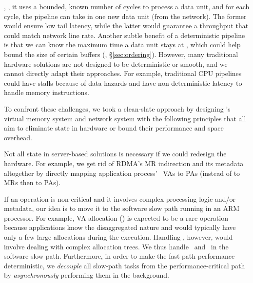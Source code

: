 ,
\ie, it uses a bounded, known number of cycles to process a data unit, and for each cycle, the pipeline can take in one new data unit (from the network).
The former would ensure low tail latency, while the latter would guarantee a throughput that could match network line rate.
Another subtle benefit of a deterministic pipeline is that we can know the maximum time a data unit stays at \MN,
which could help bound the size of certain buffers (\eg, \S\ref{sec:ordering}).
However, many traditional hardware solutions are not designed to be deterministic or smooth, and we cannot directly adapt their approaches.
For example, traditional CPU pipelines could have stalls because of data hazards and have non-deterministic latency to handle memory instructions.

To confront these challenges, we took a clean-slate approach by designing \sys's virtual memory system and network system with the following principles that all aim to eliminate state in hardware or bound their performance and space overhead.

Not all state in server-based solutions is necessary if we could redesign the hardware.
For example, we get rid of RDMA's MR indirection and its metadata altogether
by directly mapping application process' \rspace\ VAs to PAs (instead of to MRs then to PAs).

If an operation is non-critical and it involves complex processing logic and/or metadata, our idea is to move it to the software slow path running in an ARM processor.
For example, VA allocation (\alloc) is expected to be a rare operation
because applications know the disaggregated nature and would typically have only a few large allocations during the execution.
Handling \alloc, however, would involve dealing with complex allocation trees.
We thus handle \alloc\ and \sysfree\ in the software slow path.
Furthermore, in order to make the fast path performance deterministic, we {\em decouple} all slow-path tasks from the performance-critical path by {\em asynchronously} performing them in the background.



